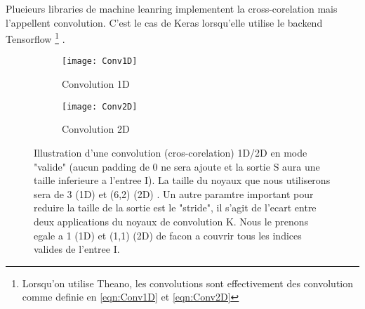 Plueieurs libraries de machine leanring implementent la cross-corelation mais l'appellent convolution. C'est le cas de Keras lorsqu'elle utilise le backend Tensorflow \footnote{Lorsqu'on utilise Theano, les convolutions sont effectivement des convolution comme definie en \ref{eqn:Conv1D} et \ref{eqn:Conv2D}} \parencite{Reference6}.
% 
% 


\begin{figure}[!h]
\begin{subfigure}{.5\textwidth}
  \centering
  \texttt{[image: Conv1D]}  
  \caption[Conv1D]{Convolution 1D \parencite{Reference10}}
\end{subfigure}
\begin{subfigure}{.5\textwidth}
  \centering
  \texttt{[image: Conv2D]}  
  \caption[Conv2D]{Convolution 2D \parencite{Reference11}}
\end{subfigure}
\label{fig:Conv1D2D}

\centering
\decoRule
\caption[Convolution1D2D]{Illustration d'une convolution (cros-corelation) 1D/2D en mode "valide" (aucun padding de 0 ne sera ajoute et la sortie S aura une taille inferieure a l'entree I). La taille du noyaux que nous utiliserons sera de 3 (1D) et (6,2) (2D) . Un autre paramtre important pour reduire la taille de la sortie est le "stride", il s'agit de l'ecart entre deux applications du noyaux de convolution K. Nous le prenons egale a 1 (1D) et (1,1) (2D) de facon a couvrir tous les indices valides de l'entree I.}
\end{figure}



